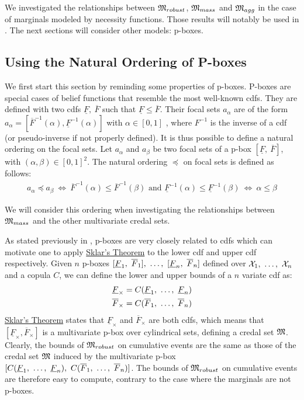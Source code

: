 We investigated the relationships between $\mathfrak{M}_{robust}$, $\mathfrak{M}_{mass}$ and $\mathfrak{M}_{agg}$ in the case of marginals modeled by necessity functions. Those results will notably be used in . The next sections will consider other models: p-boxes.

\subsection{Using the Natural Ordering of P-boxes}\label{subsec:pboxes}
We first start this section by reminding some properties of p-boxes. P-boxes are special cases of belief functions that resemble the most well-known \acrshort{cdf}s. They are defined with two \acrshort{cdf}s $\underline{F},~\overline{F}$ such that $\underline{F}\leqslant\overline{F}$. Their focal sets $a_\alpha$ are of the form $a_\alpha=[\overline{F}^{-1}(\alpha), \underline{F}^{-1}(\alpha)]$ with $\alpha\in[0,1]$ \cite{destercke_unifying_2008}, where $F^{-1}$ is the inverse of a \acrshort{cdf} (or pseudo-inverse if not properly defined). It is thus possible to define a natural ordering on the focal sets. Let $a_\alpha$ and $a_\beta$ be two focal sets of a p-box $[\underline{F},~\overline{F}]$, with $(\alpha,\beta)\in[0,1]^2$. The natural ordering $\preceq$ on focal sets is defined as follows:
\begin{align}
    a_\alpha\preceq a_\beta ~\Leftrightarrow~ \overline{F}^{-1}(\alpha)\leqslant\overline{F}^{-1}(\beta) \text{ and } \underline{F}^{-1}(\alpha)\leqslant\underline{F}^{-1}(\beta)~\Leftrightarrow~ \alpha\leqslant\beta\label{eq:order_pbox}
\end{align}

We will consider this ordering when investigating the relationships between $\mathfrak{M}_{mass}$ and the other multivariate credal sets.

As stated previously in , p-boxes are very closely related to \acrshort{cdf}s which can motivate one to apply \hyperref[theorem:sklar]{Sklar's Theorem} to the lower \acrshort{cdf} and upper \acrshort{cdf} respectively. Given $n$ p-boxes $[\underline{F}_1,~\overline{F}_1] , ~\ldots, ~ [\underline{F}_n,~\overline{F}_n]$ defined over $\mathcal{X}_1 , ~\ldots, ~ \mathcal{X}_n$ and a copula $C$, we can define the lower and upper bounds of a $n$ variate \acrshort{cdf} as:
\begin{align*}
    \underline{F}_\times&=C(\underline{F}_1 , ~\ldots, ~  \underline{F}_n)\\
    \overline{F}_\times&=C(\overline{F}_1 , ~\ldots, ~  \overline{F}_n)
\end{align*}
\hyperref[theorem:sklar]{Sklar's Theorem} states that $\underline{F}_\times$ and $\overline{F}_\times$ are both \acrshort{cdf}s, which means that $[\underline{F}_\times, \overline{F}_\times]$ is a multivariate p-box \cite{pelessoni_bivariate_2016, montes_sklars_2015} over cylindrical sets, defining a credal set $\mathfrak{M}$. Clearly, the bounds of $\mathfrak{M}_{robust}$ on cumulative events are the same as those of the credal set $\mathfrak{M}$ induced by the multivariate p-box $[C(\underline{F}_1 , ~\ldots, ~  \underline{F}_n),~C(\overline{F}_1 , ~\ldots, ~  \overline{F}_n)]$. The bounds of $\mathfrak{M}_{robust}$ on cumulative events are therefore easy to compute, contrary to the case where the marginals are not p-boxes.

